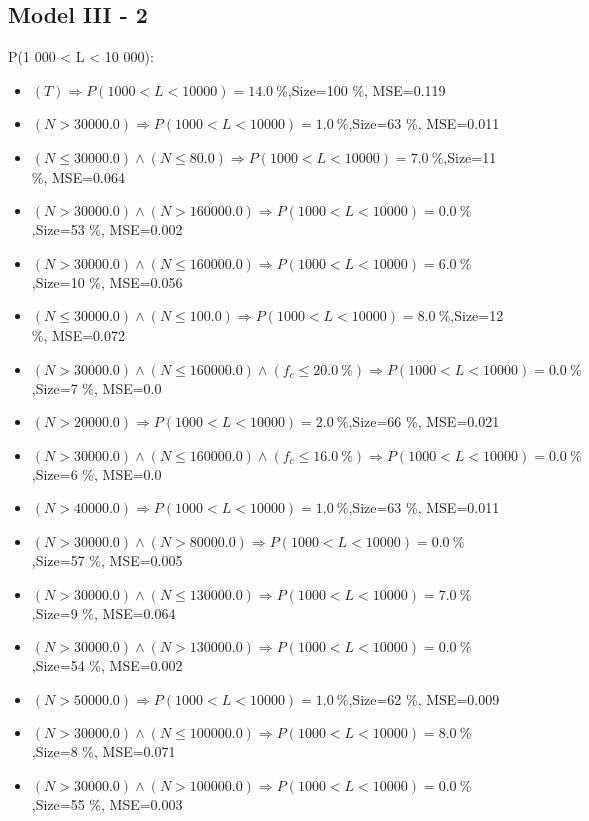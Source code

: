 \documentclass[numbered]{CSL}
\begin{document}
\subsection{Model III - 2}
P(1 000 < L < 10 000):
\begin{itemize}
\item $(T) \Rightarrow P(1 000 < L < 10 000) = 14.0~\%$,\hfill Size=100 \%, MSE=0.119
\item $(N > 30000.0) \Rightarrow P(1 000 < L < 10 000) = 1.0~\%$,\hfill Size=63 \%, MSE=0.011
\item $(N \leq 30000.0) \land (N \leq 80.0) \Rightarrow P(1 000 < L < 10 000) = 7.0~\%$,\hfill Size=11 \%, MSE=0.064
\item $(N > 30000.0) \land (N > 160000.0) \Rightarrow P(1 000 < L < 10 000) = 0.0~\%$,\hfill Size=53 \%, MSE=0.002
\item $(N > 30000.0) \land (N \leq 160000.0) \Rightarrow P(1 000 < L < 10 000) = 6.0~\%$,\hfill Size=10 \%, MSE=0.056
\item $(N \leq 30000.0) \land (N \leq 100.0) \Rightarrow P(1 000 < L < 10 000) = 8.0~\%$,\hfill Size=12 \%, MSE=0.072
\item $(N > 30000.0) \land (N \leq 160000.0) \land (f_c \leq 20.0~\%) \Rightarrow P(1 000 < L < 10 000) = 0.0~\%$,\hfill Size=7 \%, MSE=0.0
\item $(N > 20000.0) \Rightarrow P(1 000 < L < 10 000) = 2.0~\%$,\hfill Size=66 \%, MSE=0.021
\item $(N > 30000.0) \land (N \leq 160000.0) \land (f_c \leq 16.0~\%) \Rightarrow P(1 000 < L < 10 000) = 0.0~\%$,\hfill Size=6 \%, MSE=0.0
\item $(N > 40000.0) \Rightarrow P(1 000 < L < 10 000) = 1.0~\%$,\hfill Size=63 \%, MSE=0.011
\item $(N > 30000.0) \land (N > 80000.0) \Rightarrow P(1 000 < L < 10 000) = 0.0~\%$,\hfill Size=57 \%, MSE=0.005
\item $(N > 30000.0) \land (N \leq 130000.0) \Rightarrow P(1 000 < L < 10 000) = 7.0~\%$,\hfill Size=9 \%, MSE=0.064
\item $(N > 30000.0) \land (N > 130000.0) \Rightarrow P(1 000 < L < 10 000) = 0.0~\%$,\hfill Size=54 \%, MSE=0.002
\item $(N > 50000.0) \Rightarrow P(1 000 < L < 10 000) = 1.0~\%$,\hfill Size=62 \%, MSE=0.009
\item $(N > 30000.0) \land (N \leq 100000.0) \Rightarrow P(1 000 < L < 10 000) = 8.0~\%$,\hfill Size=8 \%, MSE=0.071
\item $(N > 30000.0) \land (N > 100000.0) \Rightarrow P(1 000 < L < 10 000) = 0.0~\%$,\hfill Size=55 \%, MSE=0.003

\end{itemize}
\end{document}
